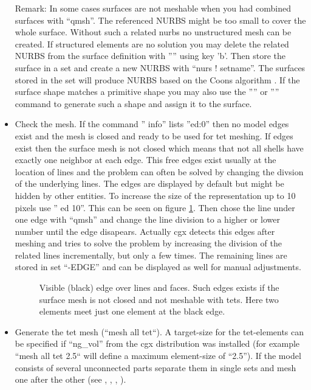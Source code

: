 \documentclass{article}
\begin{document}
\begin{appendix}
\begin{itemize}
Remark: In some cases surfaces are not meshable when you had combined surfaces with ``qmsh''. The referenced NURBS might be too small to cover the whole surface. Without such a related nurbs no unstructured mesh can be created. If structured elements are no solution you may delete the related NURBS from the surface definition with '''' using key 'b'. Then store the surface in a set and create a new NURBS with ``nurs ! setname''. The surfaces stored in the set will produce NURBS based on the Coons algorithm \cite{Coons}. If the surface shape matches a primitive shape you may also use the '''' or '''' command to generate such a shape and assign it to the surface.     

\item Check the mesh. If the command '' info'' lists ''ed:0'' then no model edges exist and the mesh is closed and ready to be used for tet meshing. If edges exist then the surface mesh is not closed which means that not all shells have exactly one neighbor at each edge. This free edges exist usually at the location of lines and the problem can often be solved by changing the divsion of the underlying lines. The edges are displayed by default but might be hidden by other entities. To increase the size of the representation up to 10 pixels use '' ed 10''. This can be seen on figure \ref{surfmesh}. Then chose the line under one edge with ``qmsh'' and change the line division to a higher or lower number until the edge disapears. Actually cgx detects this edges after meshing and tries to solve the problem by increasing the division of the related lines incrementally, but only a few times. The remaining lines are stored in set ``-EDGE'' and can be displayed as well for manual adjustments. 
  
\begin{figure}[h]
\caption{\label{surfmesh}Visible (black) edge over lines and faces. Such edges exists if the surface mesh is not closed and not meshable with tets. Here two elements meet just one element at the black edge. }
\end{figure}

\item Generate the tet mesh (``mesh all tet``). A target-size for the tet-elements can be specified if ``ng\_vol'' from the cgx distribution was installed (for example ``mesh all tet 2.5`` will define a maximum element-size of ``2.5''). If the model consists of several unconnected parts separate them in single sets and mesh one after the other (see , , , ).


\end{itemize}
\end{appendix}
\end{document}

